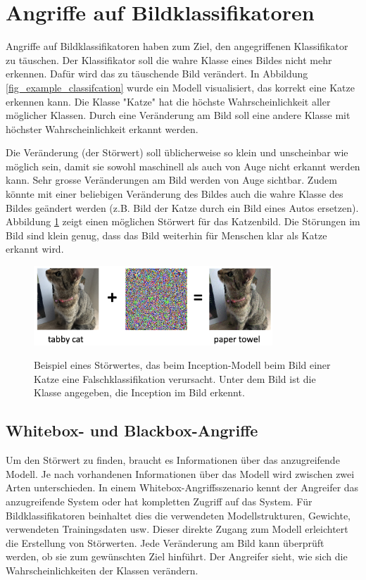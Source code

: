 \documentclass{FFHS_Thesis_Additions/ffhsthesis}
\begin{document}
\section{Angriffe auf Bildklassifikatoren}

Angriffe auf Bildklassifikatoren haben zum Ziel, den angegriffenen Klassifikator zu täuschen. 
Der Klassifikator soll die wahre Klasse eines Bildes nicht mehr erkennen. 
Dafür wird das zu täuschende Bild verändert. 
In Abbildung \ref{fig_example_classifcation} wurde ein Modell visualisiert, das korrekt eine Katze erkennen kann. 
Die Klasse "Katze"{} hat die höchste Wahrscheinlichkeit aller möglicher Klassen. Durch eine Veränderung am Bild soll eine andere Klasse mit höchster Wahrscheinlichkeit erkannt werden.

Die Veränderung (der Störwert) soll üblicherweise so klein und unscheinbar wie möglich sein, damit sie sowohl maschinell als auch von Auge nicht erkannt werden kann. Sehr grosse Veränderungen am Bild werden von Auge sichtbar. Zudem könnte mit einer beliebigen Veränderung des Bildes auch die wahre Klasse des Bildes geändert werden (z.B. Bild der Katze durch ein Bild eines Autos ersetzen). 
Abbildung \ref{fig_example_misclassifcation} zeigt einen möglichen Störwert für das Katzenbild. 
Die Störungen im Bild sind klein genug, dass das Bild weiterhin für Menschen klar als Katze erkannt wird. 

\begin{figure}[h]
\caption{Beispiel eines Störwertes, das beim Inception-Modell beim Bild einer Katze eine Falschklassifikation verursacht. Unter dem Bild ist die Klasse angegeben, die Inception im Bild erkennt.}
\centering
\includegraphics[width=0.8\textwidth]{./images/beispiel_falschklassifikation.png}
\label{fig_example_misclassifcation}
\end{figure}

\pagebreak

\subsection{Whitebox- und Blackbox-Angriffe}

Um den Störwert zu finden, braucht es Informationen über das anzugreifende Modell.
Je nach vorhandenen Informationen über das Modell wird zwischen zwei Arten unterschieden.
In einem Whitebox-Angriffsszenario kennt der Angreifer das anzugreifende System oder hat kompletten Zugriff auf das System. 
Für Bildklassifikatoren beinhaltet dies die verwendeten Modellstrukturen, Gewichte, verwendeten Trainingsdaten usw. 
Dieser direkte Zugang zum Modell erleichtert die Erstellung von Störwerten. 
Jede Veränderung am Bild kann überprüft werden, ob sie zum gewünschten Ziel hinführt. 
Der Angreifer sieht, wie sich die Wahrscheinlichkeiten der Klassen verändern. 
\end{document}
